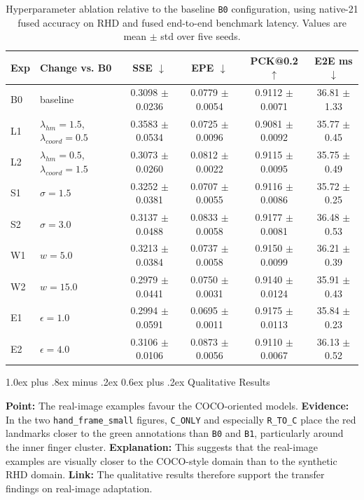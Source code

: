 \documentclass[10pt,letterpaper]{article}
\makeatletter
\renewcommand\subsection{\@startsection{subsection}{2}{\z@}%
  {1.0ex plus .8ex minus .2ex}%
  {0.6ex plus .2ex}%
  {\normalfont\itshape}}
\makeatother
\begin{document}
\begin{table}[H]
\centering
\footnotesize
\caption{Hyperparameter ablation relative to the baseline \texttt{B0} configuration, using native-21 fused accuracy on RHD and fused end-to-end benchmark latency. Values are mean $\pm$ std over five seeds.}
\label{tab:hyper_ablation}
\begin{tabular}{llcccc}
\toprule
Exp & Change vs. B0 & SSE $\downarrow$ & EPE $\downarrow$ & PCK@0.2 $\uparrow$ & E2E ms $\downarrow$ \\
\midrule
B0 & baseline & 0.3098 $\pm$ 0.0236 & 0.0779 $\pm$ 0.0054 & 0.9112 $\pm$ 0.0071 & 36.81 $\pm$ 1.33 \\
L1 & $\lambda_{hm}=1.5$, $\lambda_{coord}=0.5$ & 0.3583 $\pm$ 0.0534 & 0.0725 $\pm$ 0.0096 & 0.9081 $\pm$ 0.0092 & 35.77 $\pm$ 0.45 \\
L2 & $\lambda_{hm}=0.5$, $\lambda_{coord}=1.5$ & 0.3073 $\pm$ 0.0260 & 0.0812 $\pm$ 0.0022 & 0.9115 $\pm$ 0.0095 & 35.75 $\pm$ 0.49 \\
S1 & $\sigma=1.5$ & 0.3252 $\pm$ 0.0381 & 0.0707 $\pm$ 0.0055 & 0.9116 $\pm$ 0.0086 & 35.72 $\pm$ 0.25 \\
S2 & $\sigma=3.0$ & 0.3137 $\pm$ 0.0488 & 0.0833 $\pm$ 0.0058 & 0.9177 $\pm$ 0.0081 & 36.48 $\pm$ 0.53 \\
W1 & $w=5.0$ & 0.3213 $\pm$ 0.0384 & 0.0737 $\pm$ 0.0058 & 0.9150 $\pm$ 0.0099 & 36.21 $\pm$ 0.39 \\
W2 & $w=15.0$ & 0.2979 $\pm$ 0.0441 & 0.0750 $\pm$ 0.0031 & 0.9140 $\pm$ 0.0124 & 35.91 $\pm$ 0.43 \\
E1 & $\epsilon=1.0$ & 0.2994 $\pm$ 0.0591 & 0.0695 $\pm$ 0.0011 & 0.9175 $\pm$ 0.0113 & 35.84 $\pm$ 0.23 \\
E2 & $\epsilon=4.0$ & 0.3106 $\pm$ 0.0106 & 0.0873 $\pm$ 0.0056 & 0.9110 $\pm$ 0.0067 & 36.13 $\pm$ 0.52 \\
\bottomrule
\end{tabular}
\end{table}

\subsection{Qualitative Results}

\medskip
\noindent\textbf{Point:} The real-image examples favour the COCO-oriented models.  
\textbf{Evidence:} In the two \texttt{hand\_frame\_small} figures, \texttt{C\_ONLY} and especially \texttt{R\_TO\_C} place the red landmarks closer to the green annotations than \texttt{B0} and \texttt{B1}, particularly around the inner finger cluster.  
\textbf{Explanation:} This suggests that the real-image examples are visually closer to the COCO-style domain than to the synthetic RHD domain.  
\textbf{Link:} The qualitative results therefore support the transfer findings on real-image adaptation.
\end{document}
